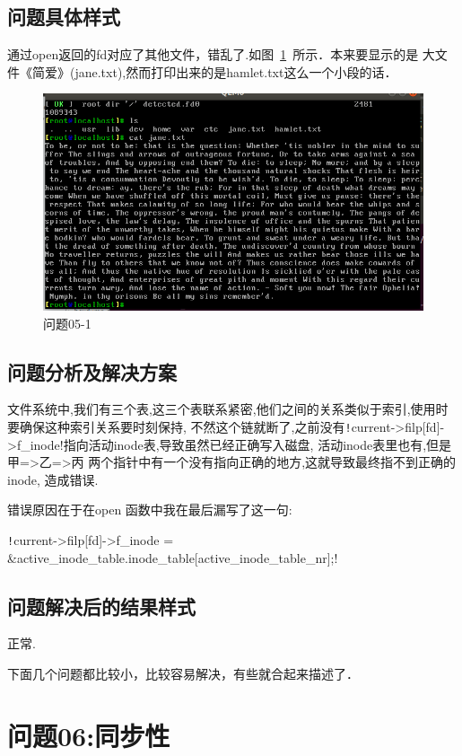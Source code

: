 \subsection{问题具体样式}
通过open返回的fd对应了其他文件，错乱了.如图~\ref{problem05_1}~所示．本来要显示的是
大文件《简爱》(jane.txt),然而打印出来的是hamlet.txt这么一个小段的话．	

\begin{figure}[!htbp]
		\centering	\includegraphics[width=14cm]{pic/assets/problems/problem05_1}
        \caption{问题05-1}	\label{problem05_1}	\end{figure}

\subsection{问题分析及解决方案}
文件系统中,我们有三个表,这三个表联系紧密,他们之间的关系类似于索引,使用时要确保这种索引关系要时刻保持,
不然这个链就断了,之前没有\texttt!current->filp[fd]->f_inode!指向活动inode表,导致虽然已经正确写入磁盘,
活动inode表里也有,但是 甲=>乙=>丙 两个指针中有一个没有指向正确的地方,这就导致最终指不到正确的inode,
造成错误.

错误原因在于在open 函数中我在最后漏写了这一句:
    
\texttt!current->filp[fd]->f_inode = &active_inode_table.inode_table[active_inode_table_nr];!

\subsection{问题解决后的结果样式}
正常.

下面几个问题都比较小，比较容易解决，有些就合起来描述了．

\section{问题06:同步性}

